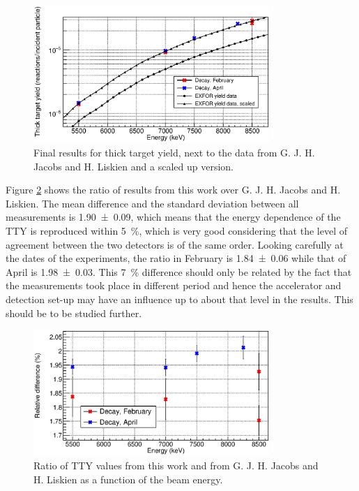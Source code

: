 \documentclass[a4paper,12pt]{report}
\begin{document}
\begin{figure}[H]
	\centering
	\includegraphics[width=0.80\textwidth]{activation_final_results.eps}	%
	\caption{Final results for thick target yield, next to the data from G. J. H. Jacobs and H. Liskien\cite{jacobs} and a scaled up version.}	%
	\label{activation_final_results}
\end{figure}

Figure \ref{activation_result_diffs} shows the ratio of results from this work over G. J. H. Jacobs and H. Liskien.\cite{jacobs}
The mean difference and the standard deviation between all measurements is \num{1.90(9)}, which means that the energy dependence of the TTY is reproduced within \qty{5}{\percent}, which is very good considering that the level of agreement between the two detectors is of the same order.
Looking carefully at the dates of the experiments, the ratio in February is \num{1.84(6)} while that of April is \num{1.98(3)}.
This \qty{7}{\percent} difference should only be related by the fact that the measurements took place in different period and hence the accelerator and detection set-up may have an influence up to about that level in the results.
This should be to be studied further.

\begin{figure}[H]
	\centering
	\includegraphics[width=0.80\textwidth]{activation_result_diffs.eps}	%
	\caption{Ratio of TTY values from this work and from G. J. H. Jacobs and H. Liskien\cite{jacobs} as a function of the beam energy.}	%
	\label{activation_result_diffs}
\end{figure}
\end{document}
